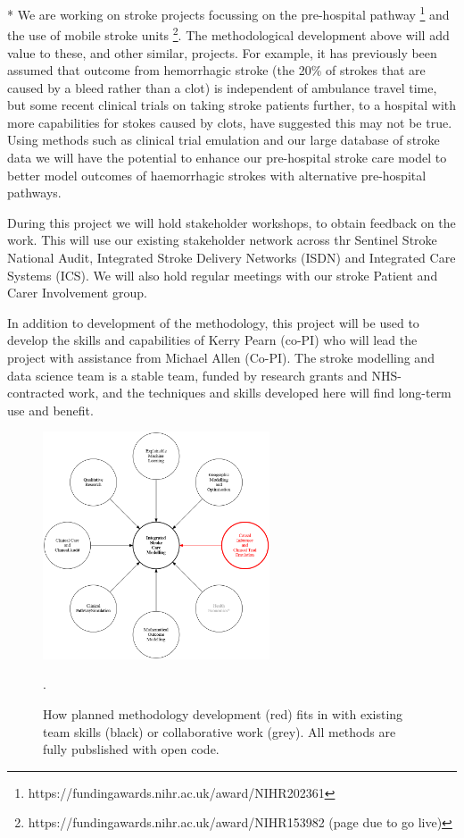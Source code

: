 * We are working on stroke projects focussing on the pre-hospital pathway \footnote{https://fundingawards.nihr.ac.uk/award/NIHR202361} and the use of mobile stroke units \footnote{https://fundingawards.nihr.ac.uk/award/NIHR153982 (page due to go live)}. The methodological development above will add value to these, and other similar, projects. For example, it has previously been assumed that outcome from hemorrhagic stroke (the 20\% of strokes that are caused by a bleed rather than a clot) is independent of ambulance travel time, but some recent clinical trials on taking stroke patients further, to a hospital with more capabilities for stokes caused by clots, have suggested this may not be true. Using methods such as clinical trial emulation and our large database of stroke data we will have the potential to enhance our pre-hospital stroke care model to better model outcomes of haemorrhagic strokes with alternative pre-hospital pathways.

During this project we will hold stakeholder workshops, to obtain feedback on the work. This will use our existing stakeholder network across thr Sentinel Stroke National Audit, Integrated Stroke Delivery Networks (ISDN) and Integrated Care Systems (ICS). We will also hold regular meetings with our stroke Patient and Carer Involvement group.

In addition to development of the methodology, this project will be used to develop the skills and capabilities of Kerry Pearn (co-PI) who will lead the project with assistance from Michael Allen (Co-PI). The stroke modelling and data science team is a stable team, funded by research grants and NHS-contracted work, and the techniques and skills developed here will find long-term use and benefit.


\begin{figure}[htbp]
\centering
\includegraphics[width=0.6\textwidth]{./images/skills}
\caption{How planned methodology development (red) fits in with existing team skills (black) or collaborative work (grey). All methods are fully pubslished with open code.}.
\label{fig:expertise}
\end{figure}
